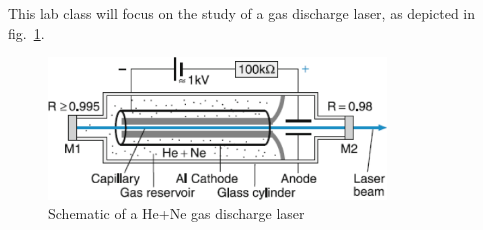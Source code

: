 \documentclass{scrartcl}
\begin{document}
This lab class will focus on the study of a gas discharge laser, as depicted in fig.~\ref{fig:gasDischargeLaser}. 
\begin{figure}[!ht]
    \centering
    \includegraphics[width=0.8\textwidth]{IntroBilder/gasDischargeLaser.png}
    \caption{Schematic of a He+Ne gas discharge laser}
    \label{fig:gasDischargeLaser}
\end{figure}
\end{document}
